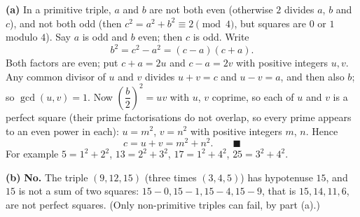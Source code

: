 \textbf{(a)} In a primitive triple, $a$ and $b$ are not both even (otherwise $2$ divides $a$, $b$ and $c$), and not both odd (then $c^2=a^2+b^2\equiv2\pmod4$, but squares are $0$ or $1$ modulo $4$). Say $a$ is odd and $b$ even; then $c$ is odd. Write
\[
b^2=c^2-a^2=(c-a)(c+a).
\]
Both factors are even; put $c+a=2u$ and $c-a=2v$ with positive integers $u,v$. Any common divisor of $u$ and $v$ divides $u+v=c$ and $u-v=a$, and then also $b$; so $\gcd(u,v)=1$. Now $\left(\dfrac {b}{2}\right)^2=uv$ with $u$, $v$ coprime, so each of $u$ and $v$ is a perfect square (their prime factorisations do not overlap, so every prime appears to an even power in each): $u=m^2$, $v=n^2$ with positive integers $m$, $n$. Hence
\[
c=u+v=m^2+n^2 .\qquad\blacksquare
\]
For example $5=1^2+2^2$, $13=2^2+3^2$, $17=1^2+4^2$, $25=3^2+4^2$.

\textbf{(b)} \textbf{No.} The triple $(9,12,15)$ (three times $(3,4,5)$) has hypotenuse $15$, and $15$ is not a sum of two squares: $15-0,15-1,15-4,15-9$, that is $15,14,11,6$, are not perfect squares. (Only non-primitive triples can fail, by part (a).)
